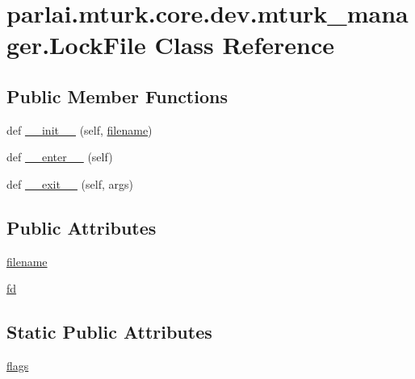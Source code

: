 \hypertarget{classparlai_1_1mturk_1_1core_1_1dev_1_1mturk__manager_1_1LockFile}{}\section{parlai.\+mturk.\+core.\+dev.\+mturk\+\_\+manager.\+Lock\+File Class Reference}
\label{classparlai_1_1mturk_1_1core_1_1dev_1_1mturk__manager_1_1LockFile}
\subsection*{Public Member Functions}
\begin{DoxyCompactItemize}
\item 
def \hyperlink{classparlai_1_1mturk_1_1core_1_1dev_1_1mturk__manager_1_1LockFile_a08af4b1dd70230bc18865ce3d1f84ac0}{\+\_\+\+\_\+init\+\_\+\+\_\+} (self, \hyperlink{classparlai_1_1mturk_1_1core_1_1dev_1_1mturk__manager_1_1LockFile_a091af512223384103a6d64c2cd0fd86a}{filename})
\item 
def \hyperlink{classparlai_1_1mturk_1_1core_1_1dev_1_1mturk__manager_1_1LockFile_a3ad9ee4f3f3de74bde0f2f5d6d8b812a}{\+\_\+\+\_\+enter\+\_\+\+\_\+} (self)
\item 
def \hyperlink{classparlai_1_1mturk_1_1core_1_1dev_1_1mturk__manager_1_1LockFile_a31fdb12564e073944e053df1a196a561}{\+\_\+\+\_\+exit\+\_\+\+\_\+} (self, args)
\end{DoxyCompactItemize}
\subsection*{Public Attributes}
\begin{DoxyCompactItemize}
\item 
\hyperlink{classparlai_1_1mturk_1_1core_1_1dev_1_1mturk__manager_1_1LockFile_a091af512223384103a6d64c2cd0fd86a}{filename}
\item 
\hyperlink{classparlai_1_1mturk_1_1core_1_1dev_1_1mturk__manager_1_1LockFile_a303b73ca7c3ab894c0b968d970df9670}{fd}
\end{DoxyCompactItemize}
\subsection*{Static Public Attributes}
\begin{DoxyCompactItemize}
\item 
\hyperlink{classparlai_1_1mturk_1_1core_1_1dev_1_1mturk__manager_1_1LockFile_a29d99800098413cab4074297d38018a3}{flags}
\end{DoxyCompactItemize}


